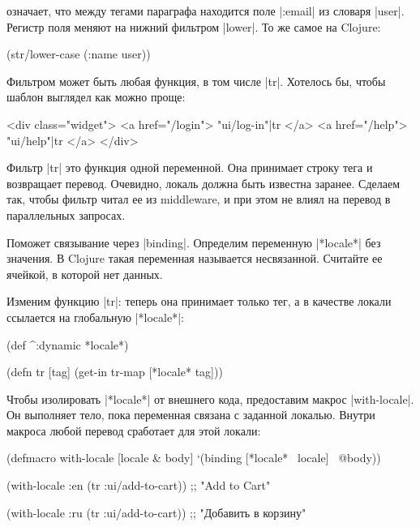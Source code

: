 \noindent
означает, что между тегами параграфа находится поле \spverb|:email| из словаря
\spverb|user|. Регистр поля меняют на нижний фильтром \spverb|lower|. То же
самое на Clojure:

\begin{english}
  \begin{clojure}
(str/lower-case (:name user))
  \end{clojure}
\end{english}

Фильтром может быть любая функция, в том числе \spverb|tr|. Хотелось бы,
чтобы шаблон выглядел как можно проще:

\begin{english}
  \begin{htmldjango}
<div class="widget">
  <a href="/login">{{ "ui/log-in"|tr }}</a>
  <a href="/help">{{ "ui/help"|tr }}</a>
</div>
  \end{htmldjango}
\end{english}

Фильтр \spverb|tr| это функция одной переменной. Она принимает строку тега и
возвращает перевод. Очевидно, локаль должна быть известна заранее. Сделаем так,
чтобы фильтр читал ее из middleware, и при этом не влиял на перевод в параллельных
запросах.

Поможет связывание через \spverb|binding|. Определим переменную
\spverb|*locale*| без значения. В Clojure такая переменная называется
несвязанной. Считайте ее ячейкой, в которой нет данных.

Изменим функцию \spverb|tr|: теперь она принимает только тег, а в качестве
локали ссылается на глобальную \spverb|*locale*|:

\begin{english}
  \begin{clojure}
(def ^:dynamic *locale*)

(defn tr [tag]
  (get-in tr-map [*locale* tag]))
  \end{clojure}
\end{english}

Чтобы изолировать \spverb|*locale*| от внешнего кода, предоставим макрос
\spverb|with-locale|. Он выполняет тело, пока переменная связана с заданной
локалью. Внутри макроса любой перевод сработает для этой локали:

  \begin{clojure}
(defmacro with-locale
  [locale & body]
  `(binding [*locale* ~locale]
     ~@body))

(with-locale :en
  (tr :ui/add-to-cart))
;; "Add to Cart"

(with-locale :ru
  (tr :ui/add-to-cart))
;; "Добавить в корзину"
  \end{clojure}

